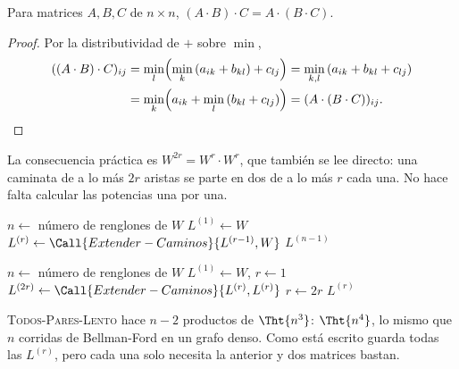 \documentclass[11pt,letterpaper]{article}
\begin{document}
\begin{proposicion}
  \label{prop:asociativo-pares}
  Para matrices $A, B, C$ de $n \times n$,
  $(A \cdot B) \cdot C = A \cdot (B \cdot C)$.
\end{proposicion}

\begin{proof}
  Por la distributividad de $+$ sobre $\min$,
  \begin{align*}
    ((A \cdot B) \cdot C)_{ij}
    &= \min_{l} \Bigl( \min_{k} \, (a_{ik} + b_{kl}) + c_{lj} \Bigr)
     = \min_{k, l} \, (a_{ik} + b_{kl} + c_{lj}) \\
    &= \min_{k} \Bigl( a_{ik} + \min_{l} \, (b_{kl} + c_{lj}) \Bigr)
     = (A \cdot (B \cdot C))_{ij} . \qedhere
  \end{align*}
\end{proof}

La consecuencia práctica es $W^{2r} = W^r \cdot W^r$, que también se
lee directo: una caminata de a lo más $2r$ aristas se parte en dos de
a lo más $r$ cada una. No hace falta calcular las potencias una por
una.

\begin{algorithm}[H]
\caption{\textsc{Todos-Pares-Lento}$(W)$}
\label{alg:pares-lento}
\begin{algorithmic}[1]
  \State $n \gets$ número de renglones de $W$
  \State $L^{(1)} \gets W$
    \State $L^{(r)} \gets \Call{Extender-Caminos}{L^{(r-1)}, W}$
  \EndFor
  \State \Return $L^{(n-1)}$
\EndProcedure
\end{algorithmic}
\end{algorithm}

\begin{algorithm}[H]
\caption{\textsc{Todos-Pares-Rápido}$(W)$}
\label{alg:pares-rapido}
\begin{algorithmic}[1]
  \State $n \gets$ número de renglones de $W$
  \State $L^{(1)} \gets W$, \quad $r \gets 1$
    \State $L^{(2r)} \gets \Call{Extender-Caminos}{L^{(r)}, L^{(r)}}$
    \State $r \gets 2r$
  \EndWhile
  \State \Return $L^{(r)}$
\EndProcedure
\end{algorithmic}
\end{algorithm}

\textsc{Todos-Pares-Lento} hace $n - 2$ productos de $\Tht{n^3}$:
$\Tht{n^4}$, lo mismo que $n$ corridas de Bellman-Ford en un grafo
denso. Como está escrito guarda todas las $L^{(r)}$, pero cada una
solo necesita la anterior y dos matrices bastan.
\end{document}

